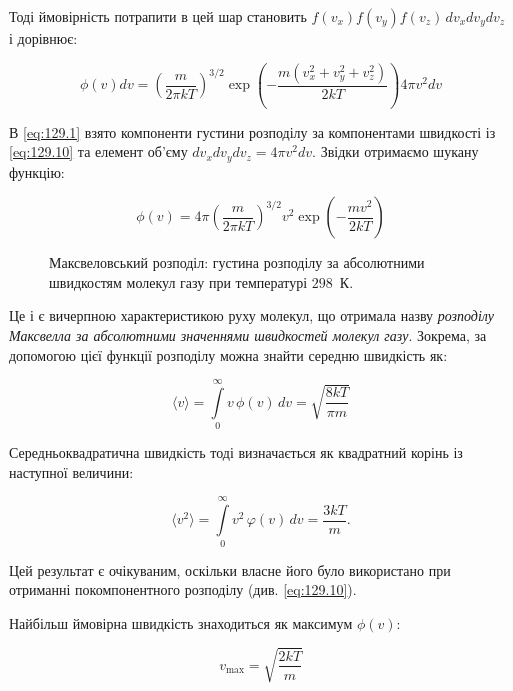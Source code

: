 Тоді ймовірність потрапити в цей шар становить
\(
f(v_x) f(v_y) f(v_z)\, dv_x dv_y dv_z
\) і дорівнює:

\begin{equation}
\phi(v)dv =  \left( \frac{m}{2 \pi kT} \right)^{3/2}\exp\left( -\frac{m (v_x^2 + v_y^2 + v_z^2)}{2 kT} \right) 4\pi v^2 dv
\label{eq:130.1}
\end{equation}

В \eqref{eq:129.1} взято компоненти густини розподілу за компонентами швидкості із \eqref{eq:129.10} та елемент об’єму $dv_x dv_y dv_z = 4\pi v^2 dv$. Звідки отримаємо шукану функцію:


\begin{equation}
\phi(v) = 4 \pi \left( \frac{m}{2 \pi kT} \right)^{3/2} v^2 \exp\left( -\frac{m v^2}{2 kT} \right)
\label{eq:130.2}
\end{equation}


\begin{figure}[h!]\centering

\caption{Максвеловський розподіл: густина розподілу за абсолютними швидкостям молекул газу  при температурі $298$~К.}
\label{pic:Pic3}
\end{figure}

Це і є вичерпною характеристикою руху молекул, що отримала назву \emph{розподілу Максвелла за абсолютними значеннями швидкостей молекул газу}. Зокрема, за допомогою цієї функції розподілу можна знайти середню швидкість як:

\begin{equation}
\langle {v} \rangle = \int\limits_0^{\infty} v \, \phi(v) \, dv = \sqrt{\frac{8 k T}{\pi m}}
\label{eq:130.3}
\end{equation}

Середньоквадратична швидкість тоді визначається як квадратний корінь із наступної величини:

\begin{equation}
\langle v^2 \rangle = \int\limits_0^{\infty} v^2 \, \varphi(v) \, dv = \frac{3kT}{m}.
\label{eq:130.4}
\end{equation}

Цей результат є очікуваним, оскільки власне його було використано при отриманні покомпонентного розподілу (див. \eqref{eq:129.10}).

Найбільш ймовірна швидкість знаходиться як максимум $\phi(v)$:

\begin{equation}\label{eq:130.5}
v_{\max} = \sqrt{\frac{2kT}{m}}
\end{equation}

